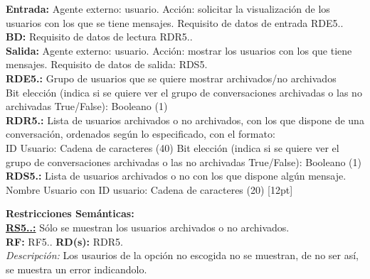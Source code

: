 \textbf{\textcolor{rojo}{Entrada:}} Agente externo: usuario. Acción: solicitar la visualización de los usuarios con los que se tiene mensajes. 
Requisito de datos de entrada \textcolor{azul}{RDE5.\theRDE}. \\[6pt]

\textbf{\textcolor{rojo}{BD:}} Requisito de datos de lectura \textcolor{azul}{RDR5.\theRDR}. \\[6pt]

\textbf{\textcolor{rojo}{Salida:}} Agente externo: usuario. Acción: mostrar los usuarios con los que tiene mensajes. 
Requisito de datos de salida: \textcolor{azul}{RDS5.\theRDS} \\[12pt]

\textcolor{azul}{\textbf{RDE5.\theRDE:}} Grupo de usuarios que se quiere mostrar archivados/no archivados\\
\hspace*{1cm} Bit elección (indica si se quiere ver el grupo de conversaciones archivadas o las no archivadas True/False): Booleano (1) \\[12pt]

\textcolor{azul}{\textbf{RDR5.\theRDR:}} Lista de usuarios archivados o no archivados, con los que dispone de una conversación, ordenados según lo especificado, con el formato:\\
\hspace*{1cm} ID Usuario: Cadena de caracteres (40) 
\hspace*{1cm} Bit elección (indica si se quiere ver el grupo de conversaciones archivadas o las no archivadas True/False): Booleano (1) \\[12pt]

\textcolor{azul}{\textbf{RDS5.\theRDS:}} Lista de usuarios archivados o no con los que dispone algún mensaje. \\
\hspace*{1cm} Nombre Usuario con ID usuario: Cadena de caracteres (20) [12pt]

\setcounter{RS}{1}
\textbf{\textcolor{verde}{Restricciones Semánticas:}} \\[6pt]
\textbf{\textcolor{verde}{\underline{RS5.\theRF.\theRS:}}} Sólo se muestran los usuarios archivados o no archivados. \\
\textbf{RF:} RF5.\theRF. \textbf{RD(s):} RDR5.\theRDR \\
\hspace*{1cm} \textit{Descripción:} Los usaurios de la opción no escogida no se muestran, de no ser así, se muestra un error indicandolo. \\ [6pt]


